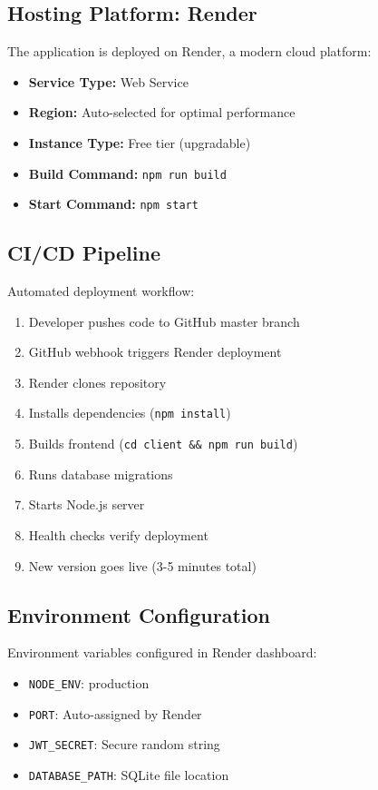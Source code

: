 \documentclass[12pt,a4paper]{article}
\begin{document}
\subsection{Hosting Platform: Render}

The application is deployed on Render, a modern cloud platform:

\begin{itemize}[leftmargin=*]
    \item \textbf{Service Type:} Web Service
    \item \textbf{Region:} Auto-selected for optimal performance
    \item \textbf{Instance Type:} Free tier (upgradable)
    \item \textbf{Build Command:} \texttt{npm run build}
    \item \textbf{Start Command:} \texttt{npm start}
\end{itemize}

\subsection{CI/CD Pipeline}

Automated deployment workflow:

\begin{enumerate}[leftmargin=*]
    \item Developer pushes code to GitHub master branch
    \item GitHub webhook triggers Render deployment
    \item Render clones repository
    \item Installs dependencies (\texttt{npm install})
    \item Builds frontend (\texttt{cd client \&\& npm run build})
    \item Runs database migrations
    \item Starts Node.js server
    \item Health checks verify deployment
    \item New version goes live (3-5 minutes total)
\end{enumerate}

\subsection{Environment Configuration}

Environment variables configured in Render dashboard:

\begin{itemize}[leftmargin=*]
    \item \texttt{NODE\_ENV}: production
    \item \texttt{PORT}: Auto-assigned by Render
    \item \texttt{JWT\_SECRET}: Secure random string
    \item \texttt{DATABASE\_PATH}: SQLite file location
\end{itemize}
\end{document}

